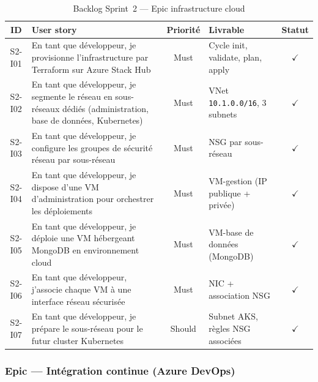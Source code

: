 \begin{table}[H]
\centering
\footnotesize
\renewcommand{\arraystretch}{0.9}
\setlength{\tabcolsep}{4pt}
\begin{tabular}{|c|p{5.2cm}|c|p{4.2cm}|c|}
\hline
\textbf{ID} & \textbf{User story} & \textbf{Priorité} & \textbf{Livrable} & \textbf{Statut} \\
\hline
S2-I01 & En tant que développeur, je provisionne l'infrastructure par Terraform sur Azure Stack Hub & Must & Cycle init, validate, plan, apply & $\checkmark$ \\
\hline
S2-I02 & En tant que développeur, je segmente le réseau en sous-réseaux dédiés (administration, base de données, Kubernetes) & Must & VNet \texttt{10.1.0.0/16}, 3 subnets & $\checkmark$ \\
\hline
S2-I03 & En tant que développeur, je configure les groupes de sécurité réseau par sous-réseau & Must & NSG par sous-réseau & $\checkmark$ \\
\hline
S2-I04 & En tant que développeur, je dispose d'une VM d'administration pour orchestrer les déploiements & Must & VM-gestion (IP publique + privée) & $\checkmark$ \\
\hline
S2-I05 & En tant que développeur, je déploie une VM hébergeant MongoDB en environnement cloud & Must & VM-base de données (MongoDB) & $\checkmark$ \\
\hline
S2-I06 & En tant que développeur, j'associe chaque VM à une interface réseau sécurisée & Must & NIC + association NSG & $\checkmark$ \\
\hline
S2-I07 & En tant que développeur, je prépare le sous-réseau pour le futur cluster Kubernetes & Should & Subnet AKS, règles NSG associées & $\checkmark$ \\
\hline
\end{tabular}
\caption{Backlog Sprint~2 — Epic infrastructure cloud}
\label{tab:s2-backlog-infra}
\end{table}

\subsubsection{Epic — Intégration continue (Azure DevOps)}

